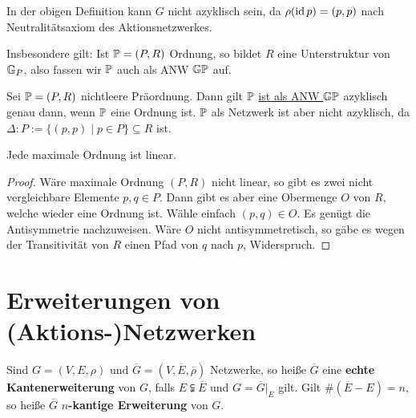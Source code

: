 \begin{bemerkungnr}
    In der obigen Definition kann $G$ nicht azyklisch sein, da $\rho(\id p) = (p,p)$ nach Neutralitätsaxiom des Aktionsnetzwerkes.
\end{bemerkungnr}

\begin{bemerkungnr}
    Insbesondere gilt: Ist $\P = (P,R)$ Ordnung, so bildet $R$ eine Unterstruktur von $\G_P$, 
    also fassen wir $\P$ auch als ANW $\G\P$ auf.
\end{bemerkungnr}

\begin{beispiel}
    Sei $\P=(P,R)$ nichtleere Präordnung. Dann gilt $\P$ \underline{ist als ANW $\G\P$} azyklisch genau
    dann, wenn $\P$ eine Ordnung ist. $\P$ als Netzwerk ist aber nicht azyklisch, da 
    $\Delta:P := \{(p,p) \mid p \in P\} \subseteq R$ ist.
\end{beispiel}

\begin{satz}
    Jede maximale Ordnung ist linear.
\end{satz}
\begin{proof}
    Wäre maximale Ordnung $(P,R)$ nicht linear, so gibt es zwei nicht vergleichbare Elemente $p,q \in P$.
    Dann gibt es aber eine Obermenge $O$ von $R$, welche wieder eine Ordnung ist.
    Wähle einfach $(p,q) \in O$. 
    Es genügt die Antisymmetrie nachzuweisen.
    Wäre $O$ nicht antisymmetretisch, so gäbe es wegen der Transitivität von $R$ einen Pfad von $q$ nach $p$, Widerspruch.
\end{proof}

\section{Erweiterungen von (Aktions-)Netzwerken}
\begin{definition}
    Sind $G=(V,E,\rho)$ und $\overline{G} = (V, \overline{E}, \overline{\rho})$ Netzwerke, so heiße
    $\overline{G}$ eine \textbf{echte Kantenerweiterung} von $G$, falls $E \subsetneqq \overline{E}$ und $G = \overline{G}|_E$ gilt.
    Gilt $\#(\overline{E}-E) = n$, so heiße $\overline{G}$ \textbf{$n$-kantige Erweiterung} von $G$.
\end{definition}

